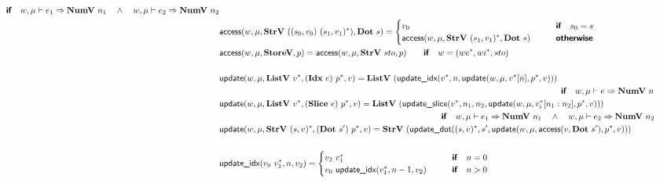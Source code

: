 \begin{align*}
  \quad\quad\premise{if}\quad
  w, \mu \vdash e_1 \Rightarrow \numv ~ n_1 \quad\land\quad
  w, \mu \vdash e_2 \Rightarrow \numv ~ n_2 \\
  &\access(w, \mu, \strv ~ ((s_0, v_0) ~ \seq{(s_1, v_1)}), \dotp ~ s) =
  \begin{cases}
    v_0 &\quad\quad\premise{if}\quad s_0 = s \\
    \access(w, \mu, \strv ~ \seq{(s_1, v_1)}, \dotp ~ s) &\quad\quad\premise{otherwise} \\
  \end{cases}
  \\
  &\access(w, \mu, \storev, p) =\access(w, \mu, \strv ~ sto, p)
  \quad\quad\premise{if}\quad w = (\seq{we}, \seq{wi}, sto)\\
%
\newline \\
  &\update(w, \mu, \listv ~ \seq{v}, (\idxp ~ e) ~ \seq{p}, v) =
  \listv ~ (\updateidx(\seq v, n, \update(w, \mu, \seq{v}[n], \seq{p}, v))) \\
  &\qquad\qquad\qquad\qquad\qquad\qquad\qquad\qquad\qquad\qquad\qquad\qquad\qquad\qquad\qquad\qquad\qquad\qquad\qquad\qquad\premise{if}\quad
  w, \mu \vdash e \Rightarrow \numv ~ n \\
  &\update(w, \mu, \listv ~ \seq{v}, (\slicep ~ e) ~ \seq{p}, v) =
  \listv ~ (\updateslice(\seq v, n_1, n_2, \update(w, \mu, \seq{v_i}[n_1: n_2], \seq{p}, v))) \\
  &\qquad\qquad\qquad\qquad\qquad\qquad\qquad\qquad\qquad\qquad\qquad\qquad\qquad\premise{if}\quad
  w, \mu \vdash e_1 \Rightarrow \numv ~ n_1 \quad\land\quad
  w, \mu \vdash e_2 \Rightarrow \numv ~ n_2 \\
  &\update(w, \mu, \strv ~ \seq{(s, v)}, (\dotp ~ s') ~ \seq{p}, v)
  =
  \strv ~ (\updatedot(\seq{(s, v)}, s', \update(w, \mu, \access(v, \dotp ~ s'), \seq{p}, v))) \\
%
\newline \\
  &\updateidx(v_0 ~ \seq{v_1}, n, v_2) =
  \begin{cases}
    v_2 ~ \seq{v_1}
    &\quad\quad\premise{if}\quad n = 0 \\
    v_0 ~ \updateidx(\seq{v_1}, n-1, v_2)
    &\quad\quad\premise{if}\quad n > 0 \\
  \end{cases} \\
%
\newline \\

\end{align*}
